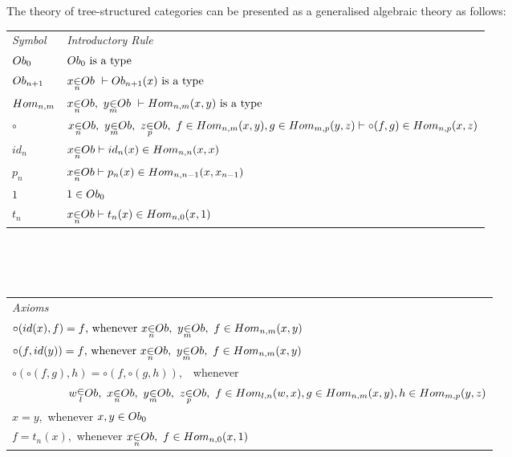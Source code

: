 \documentclass[10pt,a4paper]{scrartcl}
\begin{document}
\newcommand{\Obi}[1]{\Ob_{#1}}
\newcommand{\Homij}[2]{\Hom_{#1,#2}}
\newcommand{\ofObi}[2]{#1 \bbin{#2}{\Ob}}
\newcommand{\HomijBar}[4]{\Homij{#1}{#2}(#3,#4)}
\newcommand{\ofHomij}[5]{\ofT{#1}{\HomijBar{#2}{#3}{#4}{#5}}}
\newcommand{\HomijBarFt}[4]{\Homij{#1}{#2}(#3,\ft{#4})}
\newcommand{\ofHomiBarFt}[4]{\ofT{#1}{\HomijBarFt{#2}{#2-1}{#3}{#4}}}

\noindent The theory of tree-structured categories can be presented as a generalised algebraic theory as follows: \\
\vspace{0.03cm} 
\begin{tabular}{>{\itshape}l l}
Symbol & \itshape{Introductory Rule} \\[0.1cm]
$\Obi{0}  $&$\isT{\Obi{0}}$\\[0.2cm]
$\Obi{n+1} $&$\ofTn{x}{n}{\Ob} \    \tstyle \isT{\Obi{n+1}(x)} $\\ [0.25cm]
$\Homij{n}{m} $ &$\ofObi{x}{n} ,\  \ofObi{y}{m} \ \tstyle \isT{\HomijBar{n}{m}{x}{y}} $\\ [0.25cm]
$\circ$ & $\ofObi{x}{n}, \  \ofObi{y}{m}, \ \ofObi{z}{p}, \ \ofHomij{f}{n}{m}{x}{y},\ofHomij{g}{m}{p}{y}{z} \tstyle \ofHomij{\circ(f,g)}{n}{p}{x}{z}$ \\ [0.25cm]
$id_n   $   & $ \ofObi{x}{n} \tstyle \ofHomij{id_n(x)}{n}{n}{x}{x} $\\ [0.25cm]
$p_n   $   & $ \ofObi{x}{n} \tstyle \ofHomij{p_n(x)}{n}{n-1}{x}{x_{n-1}} $\\ [0.25cm]
$1     $   & $\ofT{1}\Obi{0} $\\         [0.25cm]
$t_n   $   & $ \ofObi{x}{n} \tstyle t_n(x) \in \Homij{n}{0}(x,1)$\\ [0.25cm]
\end{tabular} \\
\vspace{.1cm}  \\
\vspace{.03cm} \\
\begin{tabular}{l}
\itshape{Axioms} \\

$\circ(id(x),f)=f \mbox{,  whenever\ } \ofObi{x}{n} ,\  \ofObi{y}{m} , \ \ofHomij{f}{n}{m}{x}{y}  $\\ [0.25cm]
$\circ(f,id(y))=f \mbox{,  whenever\ } \ofObi{x}{n} ,\  \ofObi{y}{m} , \ \ofHomij{f}{n}{m}{x}{y}  $\\ [0.25cm]
$ \circ(\circ(f,g),h) = \circ(f,\circ(g,h)),$ \ whenever \\ [0.2cm]
$ \ \ \ \ \ \ \ \ \ \ \ \ \ \ \ 
\ofObi{w}{l} , \ \ofObi{x}{n} , \ \ofObi{y}{m} , \ \ofObi{z}{p}, \ 
 \ofHomij{f}{l}{n}{w}{x}, \ofHomij{g}{n}{m}{x}{y}, \ofHomij{h}{m}{p}{y}{z}$ \\ [0.25cm]
$x = y, $ whenever $x,y \in \Obi{0} $ \\ [0.25cm]
$f = t_n(x),  $ whenever $ \ofObi{x}{n}, \ f \in \Homij{n}{0}(x,1)$\\ [0.25cm]
\end{tabular}  \\
\end{document}
